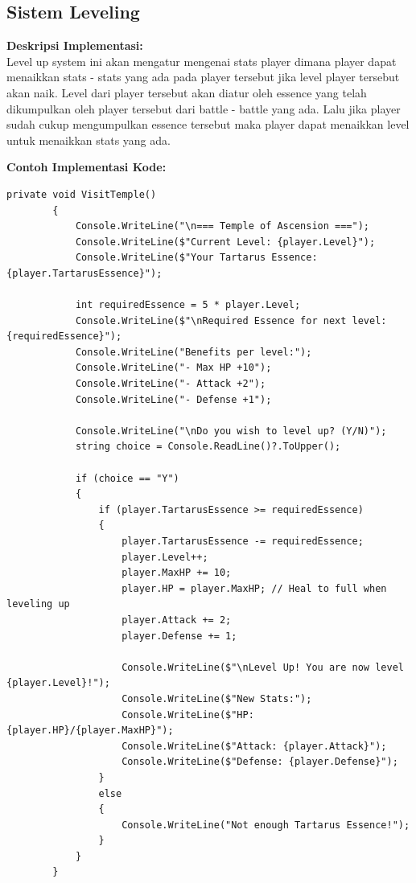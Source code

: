 \documentclass[12pt]{article}
\begin{document}
\subsection{Sistem Leveling}
\textbf{Deskripsi Implementasi:} \\
Level up system ini akan mengatur mengenai stats player dimana player dapat menaikkan stats - stats yang ada pada player tersebut jika level player tersebut akan naik. Level dari player tersebut akan diatur oleh essence yang telah dikumpulkan oleh player tersebut dari battle - battle yang ada. Lalu jika player sudah cukup mengumpulkan essence tersebut maka player dapat menaikkan level untuk menaikkan stats yang ada.

\textbf{Contoh Implementasi Kode:}
\begin{lstlisting}[language=CSharp, caption=Implementasi Boss Fight System]
private void VisitTemple()
        {
            Console.WriteLine("\n=== Temple of Ascension ===");
            Console.WriteLine($"Current Level: {player.Level}");
            Console.WriteLine($"Your Tartarus Essence: {player.TartarusEssence}");
            
            int requiredEssence = 5 * player.Level;
            Console.WriteLine($"\nRequired Essence for next level: {requiredEssence}");
            Console.WriteLine("Benefits per level:");
            Console.WriteLine("- Max HP +10");
            Console.WriteLine("- Attack +2");
            Console.WriteLine("- Defense +1");
            
            Console.WriteLine("\nDo you wish to level up? (Y/N)");
            string choice = Console.ReadLine()?.ToUpper();

            if (choice == "Y")
            {
                if (player.TartarusEssence >= requiredEssence)
                {
                    player.TartarusEssence -= requiredEssence;
                    player.Level++;
                    player.MaxHP += 10;
                    player.HP = player.MaxHP; // Heal to full when leveling up
                    player.Attack += 2;
                    player.Defense += 1;
                    
                    Console.WriteLine($"\nLevel Up! You are now level {player.Level}!");
                    Console.WriteLine($"New Stats:");
                    Console.WriteLine($"HP: {player.HP}/{player.MaxHP}");
                    Console.WriteLine($"Attack: {player.Attack}");
                    Console.WriteLine($"Defense: {player.Defense}");
                }
                else
                {
                    Console.WriteLine("Not enough Tartarus Essence!");
                }
            }
        }
\end{lstlisting}
\end{document}
